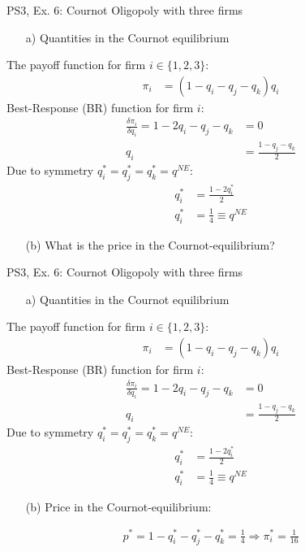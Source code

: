 \begin{frame}{PS3, Ex. 6: Cournot Oligopoly with three firms}
  \begin{multicols}{2}
    \begin{itemize}
      \item[a)] Quantities in the Cournot equilibrium
    \end{itemize}
    The payoff function for firm $i\in\{1,2,3\}$:
    \begin{align*}
        \pi_i&=(1-q_i-q_j-q_k)q_i
    \end{align*}
    Best-Response (BR) function for firm $i$:
    \begin{align*}
        \frac{\delta\pi_i}{\delta q_i}=1-2q_i-q_j-q_k&=0\\
                                                  q_i&=\frac{1-q_j-q_k}{2}
    \end{align*}
    Due to symmetry $q_i^{*}=q_j^{*}=q_k^{*}=q^{NE}$:
    \begin{align*}
        q_i^{*} &= \frac{1-2q_i^{*}}{2}\\
        q_i^{*} &= \frac{1}{4}\equiv q^{NE}
    \end{align*}
    \begin{itemize}
      \item[(b)] What is the price in the Cournot-equilibrium?
    \end{itemize}
  \vfill\null \columnbreak
  \vfill\null
  \end{multicols}
\end{frame}
\begin{frame}{PS3, Ex. 6: Cournot Oligopoly with three firms}
  \begin{multicols}{2}
    \begin{itemize}
      \item[a)] Quantities in the Cournot equilibrium
    \end{itemize}
    The payoff function for firm $i\in\{1,2,3\}$:
    \begin{align*}
        \pi_i&=(1-q_i-q_j-q_k)q_i
    \end{align*}
    Best-Response (BR) function for firm $i$:
    \begin{align*}
        \frac{\delta\pi_i}{\delta q_i}=1-2q_i-q_j-q_k&=0\\
                                                  q_i&=\frac{1-q_j-q_k}{2}
    \end{align*}
    Due to symmetry $q_i^{*}=q_j^{*}=q_k^{*}=q^{NE}$:
    \begin{align*}
        q_i^{*} &= \frac{1-2q_i^{*}}{2}\\
        q_i^{*} &= \frac{1}{4}\equiv q^{NE}
    \end{align*}
    \begin{itemize}
      \item[(b)] Price in the Cournot-equilibrium:
    \end{itemize}
    \begin{align*}
      p^{*}=1-q_i^{*}-q_j^{*}-q_k^{*}=\frac{1}{4}\Rightarrow\pi_i^{*}=\frac{1}{16}
    \end{align*}
  \vfill\null \columnbreak
  \vfill\null
  \end{multicols}
\end{frame}
